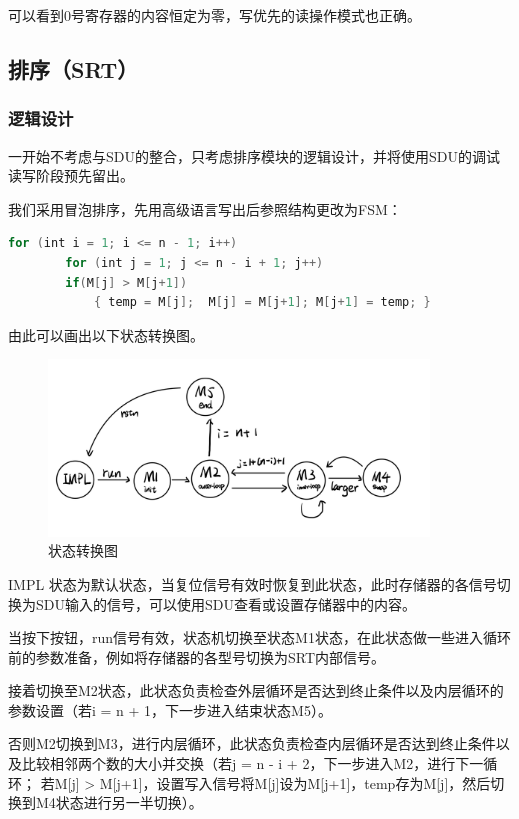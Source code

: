 \documentclass[a4paper]{article}
\begin{document}
可以看到0号寄存器的内容恒定为零，写优先的读操作模式也正确。

\subsection{排序（SRT）}
\subsubsection{逻辑设计}
一开始不考虑与SDU的整合，只考虑排序模块的逻辑设计，并将使用SDU的调试读写阶段预先留出。

我们采用冒泡排序，先用高级语言写出后参照结构更改为FSM：
\begin{lstlisting}[language={verilog},title={sort.c}]
    for (int i = 1; i <= n - 1; i++)
        for (int j = 1; j <= n - i + 1; j++)
        if(M[j] > M[j+1]) 
            { temp = M[j];  M[j] = M[j+1]; M[j+1] = temp; }
\end{lstlisting}

由此可以画出以下状态转换图。

\begin{figure}[H]
    \centering
    \includegraphics[width=0.9\textwidth]{fsm.jpeg}
    \caption{状态转换图}
    \label{fig:fsm}
  \end{figure}

IMPL 状态为默认状态，当复位信号有效时恢复到此状态，此时存储器的各信号切换为SDU输入的信号，可以使用SDU查看或设置存储器中的内容。

当按下按钮，run信号有效，状态机切换至状态M1状态，在此状态做一些进入循环前的参数准备，例如将存储器的各型号切换为SRT内部信号。

接着切换至M2状态，此状态负责检查外层循环是否达到终止条件以及内层循环的参数设置（若i = n + 1，下一步进入结束状态M5）。

否则M2切换到M3，进行内层循环，此状态负责检查内层循环是否达到终止条件以及比较相邻两个数的大小并交换（若j = n - i + 2，下一步进入M2，进行下一循环；
若M[j] > M[j+1]，设置写入信号将M[j]设为M[j+1]，temp存为M[j]，然后切换到M4状态进行另一半切换）。
\end{document}
